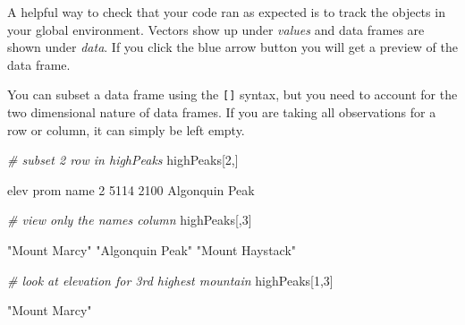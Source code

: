 \documentclass[
]{book}
\newenvironment{Shaded}{\begin{snugshade}}{\end{snugshade}}
\newcommand{\CommentTok}[1]{\textcolor[rgb]{0.56,0.35,0.01}{\textit{#1}}}
\newcommand{\DecValTok}[1]{\textcolor[rgb]{0.00,0.00,0.81}{#1}}
\newcommand{\NormalTok}[1]{#1}
\theoremstyle{definition}
\theoremstyle{definition}
\theoremstyle{definition}
\theoremstyle{definition}
\theoremstyle{remark}
\begin{document}
A helpful way to check that your code ran as expected is to track the objects in your global environment. Vectors show up under \emph{values} and data frames are shown under \emph{data}. If you click the blue arrow button you will get a preview of the data frame.

You can subset a data frame using the \texttt{{[}{]}} syntax, but you need to account for the two dimensional nature of data frames. If you are taking all observations for a row or column, it can simply be left empty.

\begin{Shaded}
\begin{Highlighting}[]
\CommentTok{\# subset 2 row in highPeaks}
\NormalTok{highPeaks[}\DecValTok{2}\NormalTok{,]}
\end{Highlighting}
\end{Shaded}

\begin{Shaded}
\begin{Highlighting}[]
\NormalTok{  elev prom           name}
\NormalTok{2 5114 2100 Algonquin Peak}
\end{Highlighting}
\end{Shaded}

\begin{Shaded}
\begin{Highlighting}[]
\CommentTok{\# view only the names column}
\NormalTok{highPeaks[,}\DecValTok{3}\NormalTok{]}
\end{Highlighting}
\end{Shaded}

\begin{Shaded}
\begin{Highlighting}[]
\NormalTok{[1] "Mount Marcy"    "Algonquin Peak" "Mount Haystack"}
\end{Highlighting}
\end{Shaded}

\begin{Shaded}
\begin{Highlighting}[]
\CommentTok{\# look at elevation for 3rd highest mountain}
\NormalTok{highPeaks[}\DecValTok{1}\NormalTok{,}\DecValTok{3}\NormalTok{]}
\end{Highlighting}
\end{Shaded}

\begin{Shaded}
\begin{Highlighting}[]
\NormalTok{[1] "Mount Marcy"}
\end{Highlighting}
\end{Shaded}
\end{document}
